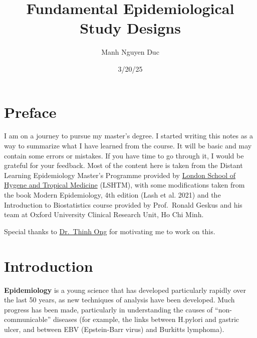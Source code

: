 \documentclass[
  letterpaper,
  DIV=11,
  numbers=noendperiod]{scrreprt}
\title{Fundamental Epidemiological Study Designs}
\author{Manh Nguyen Duc}
\date{3/20/25}
\renewcommand*\contentsname{Table of contents}
\newcommand\contentsname{Table of contents}
\begin{document}
\maketitle
\ifdefined\Shaded\renewenvironment{Shaded}{\begin{tcolorbox}[boxrule=0pt, enhanced, breakable, borderline west={3pt}{0pt}{shadecolor}, interior hidden, sharp corners, frame hidden]}{\end{tcolorbox}}\fi

\renewcommand*\contentsname{Table of contents}
{
\hypersetup{linkcolor=}
\setcounter{tocdepth}{2}
\tableofcontents
}

\hypertarget{preface}{%
\chapter*{Preface}\label{preface}}


I am on a journey to pursue my master's degree. I started writing this
notes as a way to summarize what I have learned from the course. It will
be basic and may contain some errors or mistakes. If you have time to go
through it, I would be grateful for your feedback. Most of the content
here is taken from the Distant Learning Epidemiology Master's Programme
provided by
\href{https://www.lshtm.ac.uk/study/courses/masters-degrees/epidemiology-online\#overview}{London
School of Hygene and Tropical Medicine} (LSHTM), with some modifications
taken from the book Modern Epidemiology, 4th edition (Lash et al. 2021)
and the Introduction to Biostatistics course provided by Prof.~Ronald
Geskus and his team at Oxford University Clinical Research Unit, Ho Chi
Minh.

Special thanks to \href{https://drthinhong.com/}{Dr.~Thinh Ong} for
motivating me to work on this.


\hypertarget{introduction}{%
\chapter*{Introduction}\label{introduction}}


\textbf{Epidemiology} is a young science that has developed particularly
rapidly over the last 50 years, as new techniques of analysis have been
developed. Much progress has been made, particularly in understanding
the causes of ``non-communicable'' diseases (for example, the links
between H.pylori and gastric ulcer, and between EBV (Epstein-Barr virus)
and Burkitts lymphoma).
\end{document}
